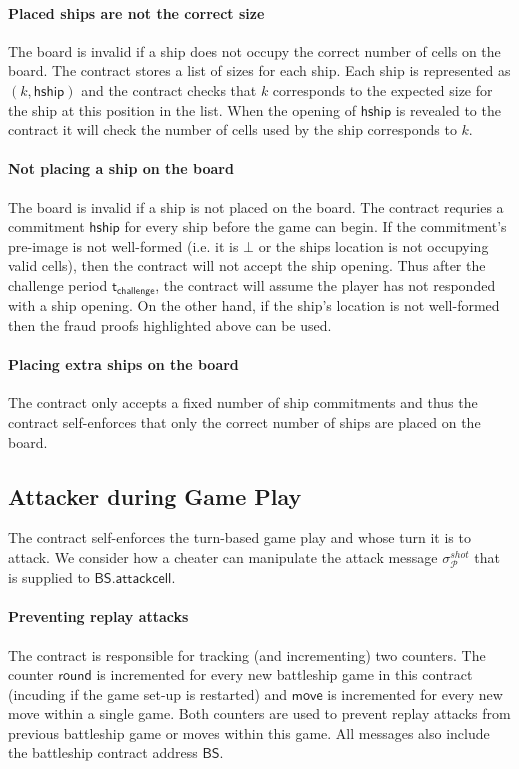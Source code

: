 \documentclass{llncs}
\newcommand{\hship}{\mathsf{hship}}
\newcommand{\participant}{\mathcal{P}}
\newcommand{\battleship}{\mathsf{BS}}
\newcommand{\battleshipattackcell}{\mathsf{BS.attackcell}}
\newcommand{\timechallenge}{\mathsf{t}_{\mathsf{challenge}}}
\begin{document}
	\paragraph{Placed ships are not the correct size} 
	The board is invalid if a ship does not occupy the correct number of cells on the board. 
	The contract stores a list of sizes for each ship. 
	Each ship is represented as $(k,\hship)$ and the contract checks that $k$ corresponds to the expected size for the ship at this position in the list. 
	When the opening of $\hship$ is revealed to the contract it will check the number of cells used by the ship corresponds to $k$. 
	
	\paragraph{Not placing a ship on the board} 
	The board is invalid if a ship is not placed on the board. 
	The contract requries a commitment $\hship$ for every ship before the game can begin.
	If the commitment's pre-image is not well-formed (i.e. it is $\bot$ or the ships location is not occupying valid cells), then the contract will not accept the ship opening.
	Thus after the challenge period $\timechallenge$, the contract will assume the player has not responded with a ship opening.
	On the other hand, if the ship's location is not well-formed then the fraud proofs highlighted above can be used. 
	
	\paragraph{Placing extra ships on the board} 
	The contract only accepts a fixed number of ship commitments and thus the contract self-enforces that only the correct number of ships are placed on the board. 
	
	\subsection{Attacker during Game Play} 
	
	The contract self-enforces the turn-based game play and whose turn it is to attack.
	We consider how a cheater can manipulate the attack message $\sigma^{shot}_{\participant}$ that is supplied to $\battleshipattackcell$. 
	
	\paragraph{Preventing replay attacks}
	The contract is responsible for tracking (and incrementing) two counters. 
	The counter $\mathsf{round}$ is incremented for every new battleship game in this contract (incuding if the game set-up is restarted) and $\mathsf{move}$ is incremented for every new move within a single game. 
	Both counters are used to prevent replay attacks from previous battleship game or moves within this game. 
	All messages also include the battleship contract address $\battleship$.
	
\end{document}
